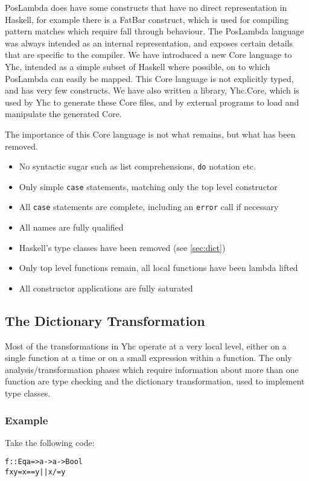 \documentclass[preprint]{sigplanconf}
\newcommand{\T}[1]{\texttt{#1}}
\newcounter{exmp}
\newcommand{\yesexample}{\subsubsection*{Example \arabic{exmp}}\addtocounter{exmp}{1}}
\newenvironment{code}{\begin{alltt}\small}{\end{alltt}}
\begin{document}
PosLambda does have some constructs that have no direct representation in
Haskell, for example there is a FatBar construct, which is used for compiling
pattern matches which require fall through behaviour. The PosLambda language
was always intended as an internal representation, and exposes certain details
that are specific to the compiler. We have introduced a new Core language to
Yhc, intended as a simple subset of Haskell where possible, on to which
PosLambda can easily be mapped. This Core language is not explicitly typed, and
has very few constructs. We have also written a library, Yhc.Core, which is
used by Yhc to generate these Core files, and by external programs to load and
manipulate the generated Core.

The importance of this Core language is not what remains, but what has been
removed.

\begin{itemize}
\item No syntactic sugar such as list comprehensions, \T{do} notation etc.
\item Only simple \T{case} statements, matching only the top level constructor
\item All \T{case} statements are complete, including an \T{error} call if
necessary
\item All names are fully qualified
\item Haskell's type classes have been removed (see \ref{sec:dict})
\item Only top level functions remain, all local functions have been lambda lifted
\item All constructor applications are fully saturated
\end{itemize}

\subsection{The Dictionary Transformation}

Most of the transformations in Yhc operate at a very local level, either on a
single function at a time or on a small expression within a function. The only
analysis/transformation phases which require information about more than one
function are type checking and the dictionary transformation, used to implement
type classes.

\yesexample

Take the following code:

\begin{code}
 f :: Eq a => a -> a -> Bool
 f x y = x == y || x /= y
\end{code}
\end{document}

